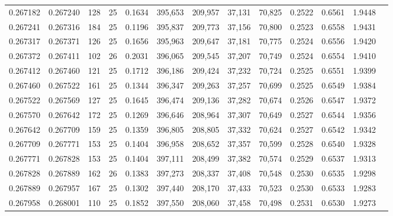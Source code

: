 \begin{tabular}{rrrrrrrrrrrrr}
0.267182 & 0.267240 &   128 &  25 &                                     0.1634 & 395,653 & 209,957 &  37,131 &  70,825 & 0.2522 & 0.6561 & 1.9448 \\
0.267241 & 0.267316 &   184 &  25 &                                     0.1196 & 395,837 & 209,773 &  37,156 &  70,800 & 0.2523 & 0.6558 & 1.9431 \\
0.267317 & 0.267371 &   126 &  25 &                                     0.1656 & 395,963 & 209,647 &  37,181 &  70,775 & 0.2524 & 0.6556 & 1.9420 \\
0.267372 & 0.267411 &   102 &  26 &                                     0.2031 & 396,065 & 209,545 &  37,207 &  70,749 & 0.2524 & 0.6554 & 1.9410 \\
0.267412 & 0.267460 &   121 &  25 &                                     0.1712 & 396,186 & 209,424 &  37,232 &  70,724 & 0.2525 & 0.6551 & 1.9399 \\
0.267460 & 0.267522 &   161 &  25 &                                     0.1344 & 396,347 & 209,263 &  37,257 &  70,699 & 0.2525 & 0.6549 & 1.9384 \\
0.267522 & 0.267569 &   127 &  25 &                                     0.1645 & 396,474 & 209,136 &  37,282 &  70,674 & 0.2526 & 0.6547 & 1.9372 \\
0.267570 & 0.267642 &   172 &  25 &                                     0.1269 & 396,646 & 208,964 &  37,307 &  70,649 & 0.2527 & 0.6544 & 1.9356 \\
0.267642 & 0.267709 &   159 &  25 &                                     0.1359 & 396,805 & 208,805 &  37,332 &  70,624 & 0.2527 & 0.6542 & 1.9342 \\
0.267709 & 0.267771 &   153 &  25 &                                     0.1404 & 396,958 & 208,652 &  37,357 &  70,599 & 0.2528 & 0.6540 & 1.9328 \\
0.267771 & 0.267828 &   153 &  25 &                                     0.1404 & 397,111 & 208,499 &  37,382 &  70,574 & 0.2529 & 0.6537 & 1.9313 \\
0.267828 & 0.267889 &   162 &  26 &                                     0.1383 & 397,273 & 208,337 &  37,408 &  70,548 & 0.2530 & 0.6535 & 1.9298 \\
0.267889 & 0.267957 &   167 &  25 &                                     0.1302 & 397,440 & 208,170 &  37,433 &  70,523 & 0.2530 & 0.6533 & 1.9283 \\
0.267958 & 0.268001 &   110 &  25 &                                     0.1852 & 397,550 & 208,060 &  37,458 &  70,498 & 0.2531 & 0.6530 & 1.9273 \\

\end{tabular}
